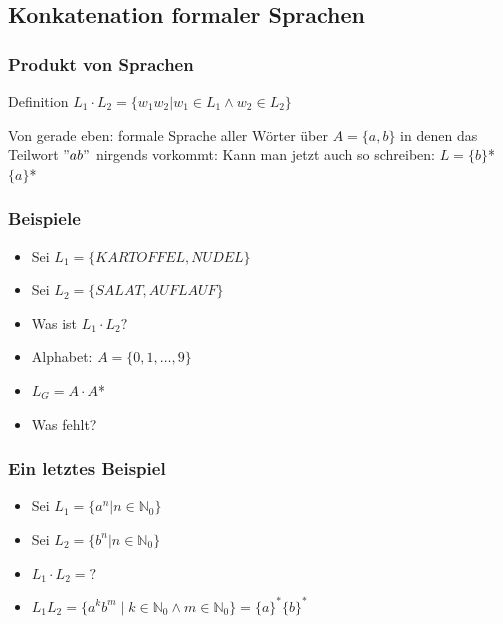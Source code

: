 \documentclass{beamer}
\begin{document}
\subsection[Konkatenation formaler Sprachen]{Konkatenation formaler Sprachen}
\begin{frame}
\frametitle{Produkt von Sprachen}
\begin{block}{Definition}
$L_{1}\cdot L_{2} = \{w_{1}w_{2}|w_{1} \in L_{1} \land w_{2} \in L_{2}\}$
\end{block}
\begin{example}
Von gerade eben: formale Sprache aller Wörter über $A=\{a,b\}$ in denen das
Teilwort $"ab"$ nirgends vorkommt: \newline
Kann man jetzt auch so schreiben: $L = \{b\}$*$\{a\}$*
\end{example}
\end{frame}
\begin{frame}
\frametitle{Beispiele}
\begin{example}
\begin{itemize}[<+->]
\item Sei $L_{1} = \{KARTOFFEL, NUDEL\}$
\item Sei $L_{2} = \{SALAT, AUFLAUF\}$
\item Was ist $L_{1} \cdot L_{2} ?$
\end{itemize}
\end{example}
\begin{example}
\begin{itemize}[<6->]
\item Alphabet: $A = \{0,1,\ldots,9\}$
\item $L_{G} = A \cdot A$*
\item Was fehlt?
\end{itemize}
\end{example}
\end{frame}
\begin{frame}
\frametitle{Ein letztes Beispiel}
\begin{itemize}[<+->]
\item Sei $L_{1} = \{a^{n}|n \in \mathbb N_{0}\}$
\item Sei $L_{2} = \{b^{n}|n \in \mathbb N_{0}\}$
\item $L_{1} \cdot L_{2} = ?$
\item $ L_1L_2 = \{ a^{k}b^{m} \mid k \in \mathbb N_{0} \land m \in \mathbb N_{0} \} = \{ a\}^{*}\{ b\}^{*}$
\end{itemize}
\end{frame}
\end{document}
